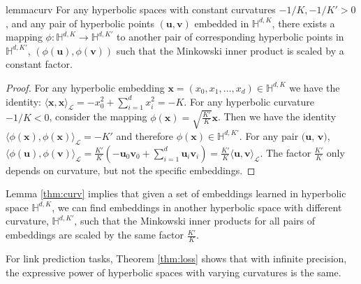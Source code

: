 \documentclass{article}
\begin{document}
\begin{restatable}[]{lemma}{curv}
\label{thm:curv}
For any hyperbolic spaces with constant curvatures $-1/K, -1/K'>0$, and any pair of hyperbolic points  $(\mathbf{u}, \mathbf{v})$ embedded in $\mathbb{H}^{d,K}$, there exists a mapping $\phi: \mathbb{H}^{d,K} \rightarrow \mathbb{H}^{d,K'}$ to another pair of corresponding hyperbolic points in $\mathbb{H}^{d,K'}$, $(\phi(\mathbf{u}), \phi(\mathbf{v}))$ such that the Minkowski inner product is scaled by a constant factor.
\end{restatable}
\begin{proof}
For any hyperbolic embedding $\mathbf{x} = (x_0, x_1, \ldots, x_d) \in \mathbb{H}^{d,K}$ we have the identity:
$\langle \mathbf{x}, \mathbf{x} \rangle_\mathcal{L} = -x_0^2 + \sum_{i=1}^d x_i^2 = -K$. 
For any hyperbolic curvature $-1/K<0$, consider the mapping $\phi(\mathbf{x}) = \sqrt{\frac{K'}{K}} \mathbf{x}$. Then we have the identity
$\langle \phi(\mathbf{x}), \phi(\mathbf{x}) \rangle_\mathcal{L} = -K'$ and therefore $\phi(\mathbf{x}) \in \mathbb{H}^{d,K'}$.
For any pair $(\mathbf{u}$, $\mathbf{v})$, $\langle \phi(\mathbf{u}), \phi(\mathbf{v}) \rangle_\mathcal{L}
= \frac{K'}{K} \left( -\mathbf{u}_0 \mathbf{v}_0 + \sum_{i=1}^d \mathbf{u}_i \mathbf{v}_i \right)
= \frac{K'}{K}\langle \mathbf{u}, \mathbf{v} \rangle_\mathcal{L}$. 
The factor $\frac{K'}{K}$ only depends on curvature, but not the specific  embeddings.
\end{proof}

Lemma \ref{thm:curv} implies that given a set of embeddings learned in hyperbolic space $\mathbb{H}^{d,K}$, we can find embeddings in another hyperbolic space with different curvature, $\mathbb{H}^{d,K'}$, such that the Minkowski inner products for all pairs of embeddings are scaled by the same factor $\frac{K'}{K}$.

For link prediction tasks, Theorem \ref{thm:loss} shows that with infinite precision, the expressive power of hyperbolic spaces with varying curvatures is the same.
\end{document}

